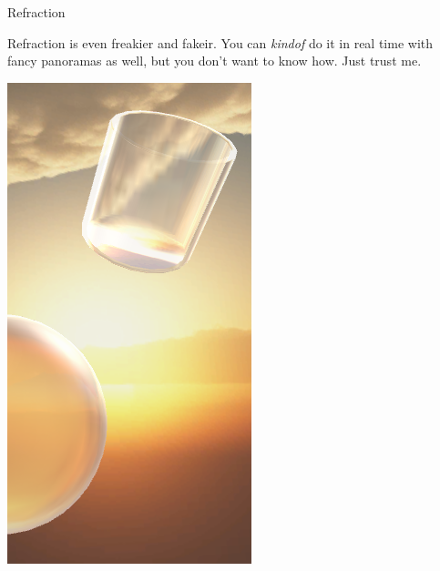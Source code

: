 \documentclass{lug}
\newcommand{\splitslide}[4]{
    \noindent
    \begin{minipage}{#1 \textwidth - #2 }
        #3
    \end{minipage}%
    \hspace{ \dimexpr #2 * 2 \relax }%
    \begin{minipage}{\textwidth - #1 \textwidth - #2 }
        #4
    \end{minipage}
}
\begin{document}
\begin{frame}{Refraction}
    \splitslide{0.65}{.7em}{
        \small

        Refraction is even freakier and fakeir. You can \textit{kindof} do it
        in real time with fancy panoramas as well, but you don't want to know
        how. Just trust me.

    }{
        \includegraphics[width=\textwidth]{graphics/refraction}
    }
\end{frame}
\end{document}
